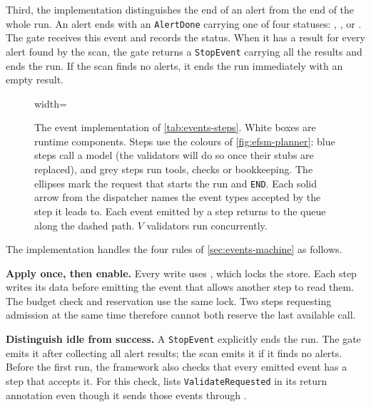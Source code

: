 Third, the implementation distinguishes the end of an alert from the end of the whole run. An
alert ends with an \texttt{AlertDone} carrying one of
four statuses: , ,  or
. The gate receives this event and records the status. When it has a
result for every alert found by the scan, the gate returns a \texttt{StopEvent} carrying all the
results and ends the run. If the scan finds no alerts, it ends the run immediately with an empty
result.

\begin{figure}[tbp]
  \centering
  \begin{adjustbox}{width=\linewidth}\end{adjustbox}
  \caption{The event implementation of \cref{tab:events-steps}. White boxes are runtime
  components. Steps use the colours of \cref{fig:efsm-planner}: blue steps call a model (the
  validators will do so once their stubs are replaced), and grey steps run tools, checks or
  bookkeeping. The ellipses mark the request that starts the run and \texttt{END}. Each solid
  arrow from the dispatcher names the event types accepted by the step it leads to. Each event
  emitted by a step returns to the queue along the dashed path. $V$ validators run concurrently.}
  \label{fig:event-loop}
\end{figure}

The implementation handles the four rules of \cref{sec:events-machine} as follows.

\bi

\item \textbf{Apply once, then enable.} Every write uses , which
locks the store. Each step writes its data before emitting the event that allows another step to
read them. The budget check and reservation use the same lock. Two steps requesting admission
at the same time therefore cannot both reserve the last available call.

\item \textbf{Distinguish idle from success.} A \texttt{StopEvent} explicitly ends the run. The
gate emits it after collecting all alert results; the scan emits it if it finds no alerts. Before
the first run, the framework also checks that every emitted event has a step that accepts it.
For this check,  lists \texttt{ValidateRequested} in its return annotation even
though it sends those events through .

